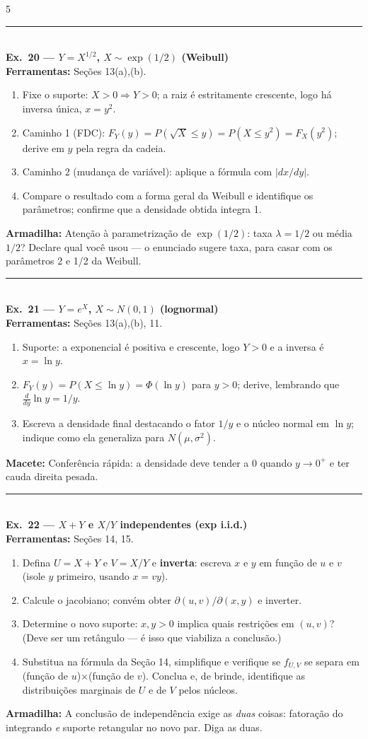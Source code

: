 \documentclass[a4paper,8pt]{extarticle}
\newcommand{\tit}[1]{\vspace{2pt}\textcolor{azul}{\rule{\linewidth}{0.6pt}}\\[1pt]\textbf{\textcolor{azul}{#1}}\\[1pt]}
\newcommand{\mac}[1]{\textcolor{verde}{\textbf{Macete:}} #1\par}
\newcommand{\arm}[1]{\textcolor{vinho}{\textbf{Armadilha:}} #1\par}
\newcommand{\ferr}[1]{\textbf{Ferramentas:} #1\par}
\begin{document}
\begin{multicols*}{5}
\tit{Ex.\ 20 — $Y=X^{1/2}$, $X\sim\exp(1/2)$ (Weibull)}
\ferr{Seções 13(a),(b).}
\begin{enumerate}
\item Fixe o suporte: $X>0\Rightarrow Y>0$; a raiz é estritamente crescente, logo há inversa única, $x=y^2$.
\item Caminho 1 (FDC): $F_Y(y)=P(\sqrt X\le y)=P(X\le y^2)=F_X(y^2)$; derive em $y$ pela regra da cadeia.
\item Caminho 2 (mudança de variável): aplique a fórmula com $|dx/dy|$.
\item Compare o resultado com a forma geral da Weibull e identifique os parâmetros; confirme que a densidade obtida integra 1.
\end{enumerate}
\arm{Atenção à parametrização de $\exp(1/2)$: taxa $\lambda=1/2$ ou média $1/2$? Declare qual você usou — o enunciado sugere taxa, para casar com os parâmetros 2 e 1/2 da Weibull.}

\tit{Ex.\ 21 — $Y=e^X$, $X\sim N(0,1)$ (lognormal)}
\ferr{Seções 13(a),(b), 11.}
\begin{enumerate}
\item Suporte: a exponencial é positiva e crescente, logo $Y>0$ e a inversa é $x=\ln y$.
\item $F_Y(y)=P(X\le \ln y)=\Phi(\ln y)$ para $y>0$; derive, lembrando que $\frac{d}{dy}\ln y=1/y$.
\item Escreva a densidade final destacando o fator $1/y$ e o núcleo normal em $\ln y$; indique como ela generaliza para $N(\mu,\sigma^2)$.
\end{enumerate}
\mac{Conferência rápida: a densidade deve tender a 0 quando $y\to0^{+}$ e ter cauda direita pesada.}

\tit{Ex.\ 22 — $X+Y$ e $X/Y$ independentes (exp i.i.d.)}
\ferr{Seções 14, 15.}
\begin{enumerate}
\item Defina $U=X+Y$ e $V=X/Y$ e \textbf{inverta}: escreva $x$ e $y$ em função de $u$ e $v$ (isole $y$ primeiro, usando $x=vy$).
\item Calcule o jacobiano; convém obter $\partial(u,v)/\partial(x,y)$ e inverter.
\item Determine o novo suporte: $x,y>0$ implica quais restrições em $(u,v)$? (Deve ser um retângulo — é isso que viabiliza a conclusão.)
\item Substitua na fórmula da Seção 14, simplifique e verifique se $f_{U,V}$ se separa em (função de $u$)$\times$(função de $v$). Conclua e, de brinde, identifique as distribuições marginais de $U$ e de $V$ pelos núcleos.
\end{enumerate}
\arm{A conclusão de independência exige as \emph{duas} coisas: fatoração do integrando \emph{e} suporte retangular no novo par. Diga as duas.}


\end{multicols*}
\end{document}

